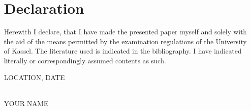 \chapter*{Declaration}

Herewith I declare, that I have made the presented paper myself and solely
with the aid of the means permitted by the examination regulations of the
University of Kassel.
The literature used is indicated in the bibliography.
I have indicated literally or correspondingly assumed contents as such.

\vspace{1cm}

LOCATION, DATE

\begin{flushright}
  \underline{\hspace{7cm}} \\
  YOUR NAME
\end{flushright}
